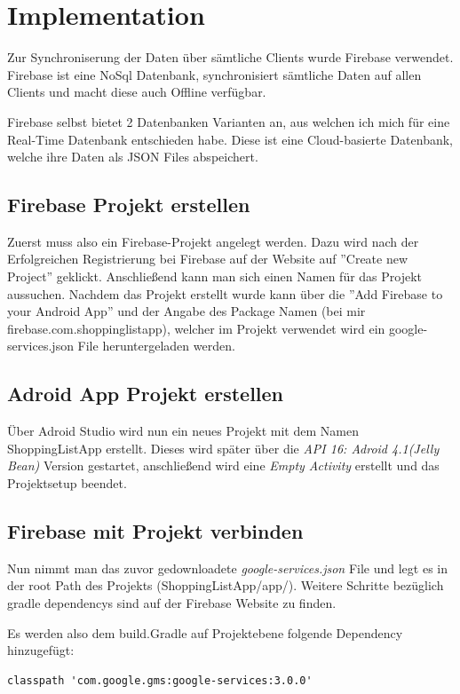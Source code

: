 
\section{Implementation}
\label{sec:Ergebnisse}
Zur Synchroniserung der Daten über sämtliche Clients wurde Firebase verwendet. Firebase ist eine NoSql Datenbank, synchronisiert sämtliche Daten auf allen Clients und macht diese auch Offline verfügbar. 

Firebase selbst bietet 2 Datenbanken Varianten an, aus welchen ich mich für eine Real-Time Datenbank entschieden habe. Diese ist eine Cloud-basierte Datenbank, welche ihre Daten als JSON Files abspeichert.

\subsection{Firebase Projekt erstellen}
Zuerst muss also ein Firebase-Projekt angelegt werden. Dazu wird nach der Erfolgreichen Registrierung bei Firebase auf der Website auf ''Create new Project'' geklickt. 
Anschließend kann man sich einen Namen für das Projekt aussuchen. Nachdem das Projekt erstellt wurde kann über die ''Add Firebase to your Android App'' und der Angabe des Package Namen (bei mir firebase.com.shoppinglistapp), welcher im Projekt verwendet wird ein google-services.json File heruntergeladen werden.

\subsection{Adroid App Projekt erstellen}
Über Adroid Studio wird nun ein neues Projekt mit dem Namen ShoppingListApp erstellt.
Dieses wird später über die \textit{API 16: Adroid 4.1(Jelly Bean)} Version gestartet, anschließend wird eine \textit{Empty Activity} erstellt und das Projektsetup beendet. 

\subsection{Firebase mit Projekt verbinden}
Nun nimmt man das zuvor gedownloadete \textit{google-services.json} File und legt es in der root Path des Projekts (ShoppingListApp/app/). Weitere Schritte bezüglich gradle dependencys sind auf der Firebase Website zu finden. 

Es werden also dem build.Gradle auf Projektebene folgende Dependency hinzugefügt:

\begin{lstlisting}
classpath 'com.google.gms:google-services:3.0.0'
\end{lstlisting}

